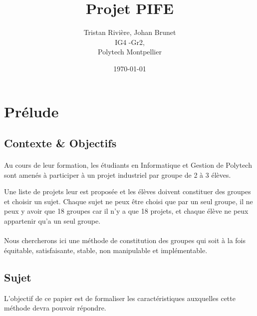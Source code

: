 \documentclass[10pt,a4paper]{article}
\begin{document}
\title{Projet PIFE}
\author{Tristan Rivière, Johan Brunet\\
   IG4 -Gr2,\\
   Polytech Montpellier}
\date{\today}

\maketitle
\section{Prélude}
\subsection{Contexte \& Objectifs}
\paragraph*{}
Au cours de leur formation, les étudiants en Informatique et Gestion de Polytech sont amenés à participer à un projet industriel par groupe de 2 à 3 élèves.

Une liste de projets leur est proposée et les élèves doivent constituer des groupes et choisir un sujet. Chaque sujet ne peux être choisi que par un seul groupe, il ne peux y avoir que 18 groupes car il n'y a que 18 projets, et chaque élève ne peux appartenir qu'a un seul groupe.
\paragraph*{}
Nous chercherons ici une méthode de constitution des groupes qui soit à la fois équitable, satisfaisante, stable, non manipulable et implémentable.
\subsection{Sujet}
L'objectif de ce papier est de formaliser les caractéristiques auxquelles cette méthode devra pouvoir répondre.
\end{document}
